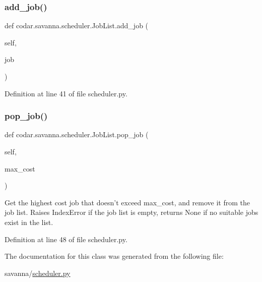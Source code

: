 \subsubsection{\texorpdfstring{add\+\_\+job()}{add\_job()}}
{\footnotesize\ttfamily def codar.\+savanna.\+scheduler.\+Job\+List.\+add\+\_\+job (\begin{DoxyParamCaption}\item[{}]{self,  }\item[{}]{job }\end{DoxyParamCaption})}



Definition at line 41 of file scheduler.\+py.

\mbox{\label{classcodar_1_1savanna_1_1scheduler_1_1_job_list_a5aacbb616928bc7e9078ea08afe8d5ef}} 
\subsubsection{\texorpdfstring{pop\+\_\+job()}{pop\_job()}}
{\footnotesize\ttfamily def codar.\+savanna.\+scheduler.\+Job\+List.\+pop\+\_\+job (\begin{DoxyParamCaption}\item[{}]{self,  }\item[{}]{max\+\_\+cost }\end{DoxyParamCaption})}

\begin{DoxyVerb}Get the highest cost job that doesn't exceed max_cost, and remove
it from the job list. Raises IndexError if the job list is empty,
returns None if no suitable jobs exist in the list.\end{DoxyVerb}
 

Definition at line 48 of file scheduler.\+py.



The documentation for this class was generated from the following file\+:\begin{DoxyCompactItemize}
\item 
savanna/\hyperlink{scheduler_8py}{scheduler.\+py}\end{DoxyCompactItemize}
